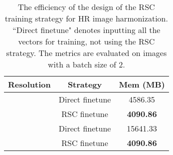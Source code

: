 \documentclass[10pt,journal,twocolumn,twoside]{IEEEtran}
\begin{document}
\begin{table}[t]
\caption{The efficiency of the design of the RSC training strategy for HR image harmonization. ``Direct finetune" denotes inputting all the vectors for training, not using the RSC strategy.  The metrics are evaluated on images with a batch size of 2.}
    \label{tab:Efficiency of RSC}
\centering
\begin{tabular}{c|c|c}
\hline
Resolution            & Strategy        & Mem (MB)         \\ \hline
\multirow{2}{*}{} & Direct finetune & 4586.35          \\
                      & RSC finetune    & \textbf{4090.86} \\ \hline
\multirow{2}{*}{} & Direct finetune & 15641.33         \\
                      & RSC finetune    & \textbf{4090.86} \\ \hline
\end{tabular}
    
\end{table}



\begin{table}[t]
    \caption{Demonstration of the effectiveness of MLPs decoupling. The experiments are conducted on LR iHarmony4 dataset.}
    \label{tab:Decouple}
    \renewcommand{\arraystretch}{1.1} 
    \centering

\end{table}
\end{document}
